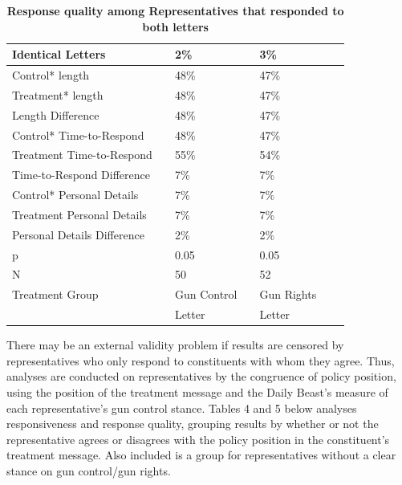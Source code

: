 \documentclass[12pt]{article}
\begin{document}
 \begin{table}[h!]
	\caption{\textbf{Response quality among Representatives that responded to both letters}}
	\label{tab2}
	\begin{tabular}{lllllll}
		\textbf{Identical Letters}   && \textbf{2\%}           &&   \textbf{3\%} \\
		\hline
	    Control* length   && 48\%            &&   47\%\\
	    Treatment* length   && 48\%            &&   47\%\\
	    Length Difference   && 48\%            &&   47\%\\
	    \hline
	    Control* Time-to-Respond   && 48\%            &&   47\%\\
	    Treatment Time-to-Respond && 55\%          &&   54\%\\ 
	    Time-to-Respond Difference && 7\%            &&   7\%\\ 
	    \hline
	    Control* Personal Details                && 7\%            &&   7\%\\
	    Treatment Personal Details                && 7\%            &&   7\%\\
	    Personal Details Difference && 2\%                      && 2\%\\
	    \hline
	    p            && 0.05 				&&   0.05 \\
	    N 			 &&      50 			 &&  52    \\
	    \hline
	    Treatment Group && Gun Control  && Gun Rights & \\
	    &&	Letter		&& Letter
	\end{tabular}
\end{table}

There may be an external validity problem if results are censored by representatives who only respond to constituents with whom they agree. Thus, analyses are conducted on representatives by the congruence of policy position, using the position of the treatment message and the Daily Beast's measure of each representative's gun control stance. Tables 4 and 5 below analyses responsiveness and response quality, grouping results by whether or not the representative agrees or disagrees with the policy position in the constituent's treatment message. Also included is a group for representatives without a clear stance on gun control/gun rights.
\end{document}
